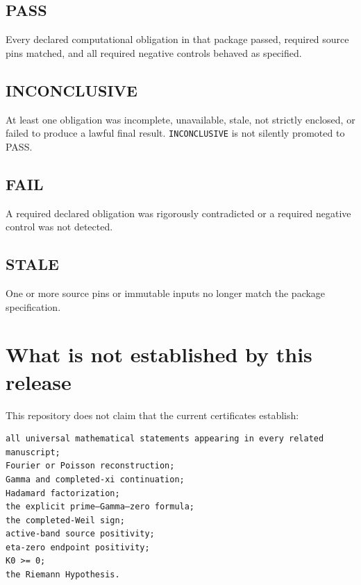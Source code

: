 \hypertarget{pass}{%
\subsection{PASS}\label{pass}}

Every declared computational obligation in that package passed, required source pins matched, and all required negative controls behaved as specified.

\hypertarget{inconclusive}{%
\subsection{INCONCLUSIVE}\label{inconclusive}}

At least one obligation was incomplete, unavailable, stale, not strictly enclosed, or failed to produce a lawful final result. \texttt{INCONCLUSIVE} is not silently promoted to PASS.

\hypertarget{fail}{%
\subsection{FAIL}\label{fail}}

A required declared obligation was rigorously contradicted or a required negative control was not detected.

\hypertarget{stale}{%
\subsection{STALE}\label{stale}}

One or more source pins or immutable inputs no longer match the package specification.

\hypertarget{what-is-not-established-by-this-release}{%
\section{What is not established by this release}\label{what-is-not-established-by-this-release}}

This repository does not claim that the current certificates establish:

\begin{verbatim}
all universal mathematical statements appearing in every related manuscript;
Fourier or Poisson reconstruction;
Gamma and completed-xi continuation;
Hadamard factorization;
the explicit prime–Gamma–zero formula;
the completed-Weil sign;
active-band source positivity;
eta-zero endpoint positivity;
K0 >= 0;
the Riemann Hypothesis.
\end{verbatim}

